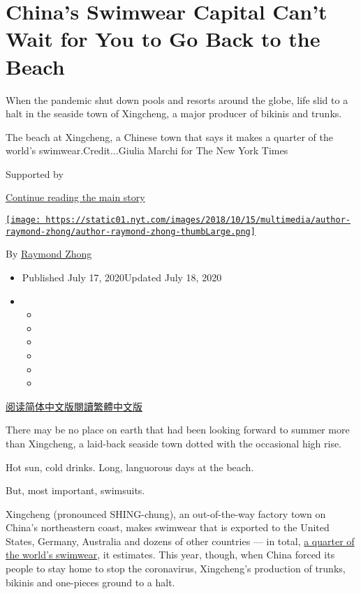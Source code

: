 \hypertarget{chinas-swimwear-capital-cant-wait-for-you-to-go-back-to-the-beach}{%
\section{China's Swimwear Capital Can't Wait for You to Go Back to the
Beach}\label{chinas-swimwear-capital-cant-wait-for-you-to-go-back-to-the-beach}}

When the pandemic shut down pools and resorts around the globe, life
slid to a halt in the seaside town of Xingcheng, a major producer of
bikinis and trunks.

The beach at Xingcheng, a Chinese town that says it makes a quarter of
the world's swimwear.Credit...Giulia Marchi for The New York Times

Supported by

\protect\hyperlink{after-sponsor}{Continue reading the main story}

\href{https://www.nytimes.com/by/raymond-zhong}{\texttt{[image: https://static01.nyt.com/images/2018/10/15/multimedia/author-raymond-zhong/author-raymond-zhong-thumbLarge.png]}}

By \href{https://www.nytimes.com/by/raymond-zhong}{Raymond Zhong}

\begin{itemize}
\item
  Published July 17, 2020Updated July 18, 2020
\item
  \begin{itemize}
  \item
  \item
  \item
  \item
  \item
  \item
  \end{itemize}
\end{itemize}

\href{https://cn.nytimes.com/business/20200720/china-coronavirus-swimsuits/}{阅读简体中文版}\href{https://cn.nytimes.com/business/20200720/china-coronavirus-swimsuits/zh-hant/}{閱讀繁體中文版}

There may be no place on earth that had been looking forward to summer
more than Xingcheng, a laid-back seaside town dotted with the occasional
high rise.

Hot sun, cold drinks. Long, languorous days at the beach.

But, most important, swimsuits.

Xingcheng (pronounced SHING-chung), an out-of-the-way factory town on
China's northeastern coast, makes swimwear that is exported to the
United States, Germany, Australia and dozens of other countries --- in
total,
\href{https://www.chinadailyhk.com/articles/121/151/137/1557484560000.html?newsId=82464}{a
quarter of the world's swimwear}, it estimates. This year, though, when
China forced its people to stay home to stop the coronavirus,
Xingcheng's production of trunks, bikinis and one-pieces ground to a
halt.

